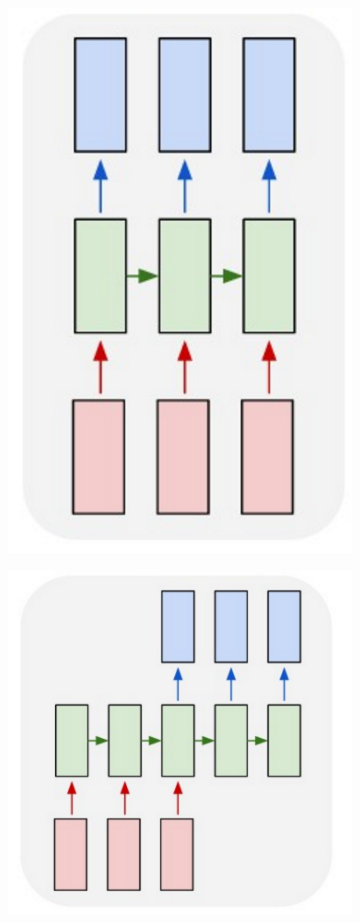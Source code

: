 \documentclass[12pt,a4paper]{amsart}
\begin{document}
\begin{figure}[!h]
\begin{subfigure}{0.31\textwidth}
		\includegraphics[scale=0.5]{imgs/rnn-many-to-many-2.png}
		\caption{}
		\label{fig:rnn-variants-many-to-many}
	\end{subfigure}\hfill
	\begin{subfigure}{0.31\textwidth}
		\includegraphics[scale=0.47]{imgs/rnn-many-to-many.png}

\end{subfigure}
\end{figure}
\end{document}
